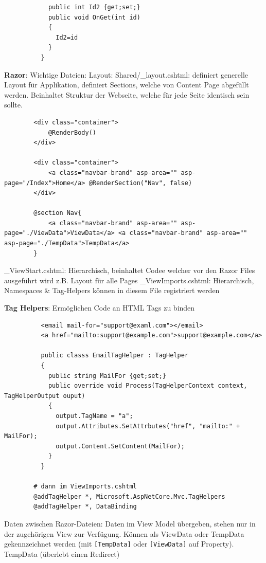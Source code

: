 \documentclass[10pt,landscape]{article}
\begin{document}
\begin{multicols}{2}
\begin{lstlisting}
            public int Id2 {get;set;}
            public void OnGet(int id)
            {
              Id2=id
            }
          }
        \end{lstlisting}

        \textbf{Razor}: Wichtige Dateien: Layout: Shared/\_layout.cshtml: definiert generelle Layout für Applikation, definiert Sections, welche von Content Page abgefüllt werden.
        Beinhaltet Struktur der Webseite, welche für jede Seite identisch sein sollte.

        \begin{lstlisting}
        <div class="container">
            @RenderBody()
        </div>

        <div class="container">
            <a class="navbar-brand" asp-area="" asp-page="/Index">Home</a> @RenderSection("Nav", false)
        </div>

        @section Nav{
            <a class="navbar-brand" asp-area="" asp-page="./ViewData">ViewData</a> <a class="navbar-brand" asp-area="" asp-page="./TempData">TempData</a>
        }
        \end{lstlisting}

        \_ViewStart.cshtml: Hierarchisch, beinhaltet Codee welcher vor den Razor Files ausgeführt wird z.B. Layout für alle Pages
        \_ViewImports.cshtml: Hierarchisch, Namespaces \& Tag-Helpers können in diesem File registriert werden

        \textbf{Tag Helpers}: Ermöglichen Code an HTML Tags zu binden
        \begin{lstlisting}
          <email mail-for="support@examl.com"></email>
          <a href="mailto:support@example.com">support@example.com</a>

          public classs EmailTagHelper : TagHelper 
          {
            public string MailFor {get;set;}
            public override void Process(TagHelperContext context, TagHelperOutput ouput)
            {
              output.TagName = "a";
              output.Attributes.SetAttrbutes("href", "mailto:" + MailFor);
              output.Content.SetContent(MailFor);
            }
          }

        # dann im ViewImports.cshtml
        @addTagHelper *, Microsoft.AspNetCore.Mvc.TagHelpers
        @addTagHelper *, DataBinding
        \end{lstlisting}

        Daten zwischen Razor-Dateien: Daten im View Model übergeben, stehen nur in der zugehörigen View zur Verfügung.
        Können als ViewData oder TempData gekennzeichnet werden (mit \lstinline{[TempData]} oder \lstinline{[ViewData]} auf Property).
        TempData (überlebt einen Redirect)


\end{multicols}
\end{document}
